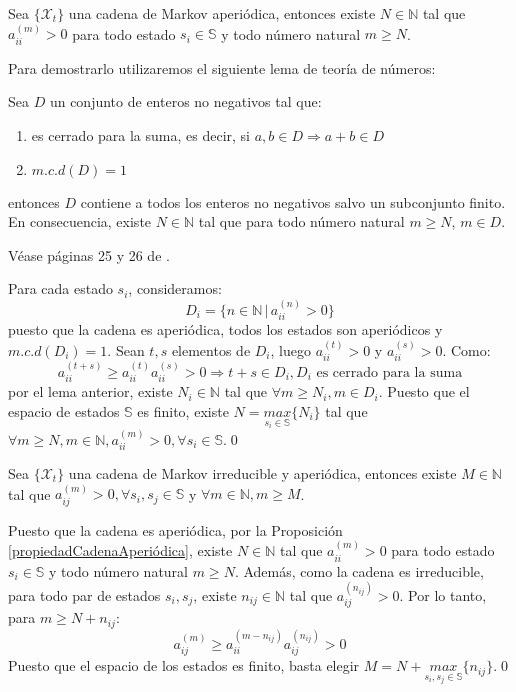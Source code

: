 \begin{proposition}\label{propiedadCadenaAperiódica}
    Sea $\{\mathcal{X}_t\}$ una cadena de Markov aperiódica, entonces existe $N\in\mathbb{N}$ tal que $a_{ii}^{(m)}>0$ para todo estado $s_i\in\mathbb{S}$ y todo número natural $m\geq N$.
\end{proposition}
Para demostrarlo utilizaremos el siguiente lema de teoría de números:
\begin{lemma}
Sea $D$ un conjunto de enteros no negativos tal que:
\begin{enumerate}
    \item es cerrado para la suma, es decir, si $a,b\in D\Longrightarrow a+b\in D$
    \item $m.c.d(D)=1$
\end{enumerate}
entonces $D$ contiene a todos los enteros no negativos salvo un subconjunto finito. En consecuencia, existe $N\in\mathbb{N}$ tal que para todo número natural $m\geq N$, $m\in D$.
\end{lemma}
\begin{proofs*}
    Véase páginas 25 y 26 de \cite{Klappenecker}.  
\end{proofs*}
\begin{proofs*}
Para cada estado $s_i$, consideramos:
\[D_i=\{n\in\mathbb{N}\,|\, a_{ii}^{(n)}>0\}\]
puesto que la cadena es aperiódica, todos los estados son aperiódicos y $m.c.d(D_i)=1$. Sean $t,s$ elementos de $D_i$, luego $a_{ii}^{(t)}>0$ y $a_{ii}^{(s)}>0$. Como:
\[a_{ii}^{(t+s)}\geq a_{ii}^{(t)}a_{ii}^{(s)}>0\Longrightarrow t+s\in D_i,D_i \text{ es cerrado para la suma}\]
por el lema anterior, existe $N_i\in\mathbb{N}$ tal que $\forall m\geq N_i, m\in D_i$. Puesto que el espacio de estados $\mathbb{S}$ es finito, existe $N=\underset{s_i\in\mathbb{S}}{max}\{N_i\}$ tal que $\forall m\geq N, m\in\mathbb{N}, a_{ii}^{(m)}>0, \forall s_i\in\mathbb{S}$.\qed
\end{proofs*}

\begin{proposition}\label{propiedadCadenaIrreducibleAperiódica}
    Sea $\{\mathcal{X}_t\}$ una cadena de Markov irreducible y aperiódica, entonces existe $M\in\mathbb{N}$ tal que $a_{ij}^{(m)}>0, \forall s_i, s_j\in\mathbb{S}$ y $\forall m\in\mathbb{N}, m\geq M$.
\end{proposition}
\begin{proofs*}
Puesto que la cadena es aperiódica, por la Proposición \ref{propiedadCadenaAperiódica}, existe $N\in\mathbb{N}$ tal que $a_{ii}^{(m)}>0$ para todo estado $s_i\in\mathbb{S}$ y todo número natural $m\geq N$.
Además, como la cadena es irreducible, para todo par de estados $s_i, s_j$, existe $n_{ij}\in\mathbb{N}$ tal que $a_{ij}^{(n_{ij})}>0$. Por lo tanto, para $m\geq N+n_{ij}$:
\[a_{ij}^{(m)}\geq a_{ii}^{(m-n_{ij})}a_{ij}^{(n_{ij})}>0\]
Puesto que el espacio de los estados es finito, basta elegir $M=N+\underset{s_i,s_j\in\mathbb{S}}{max}\{n_{ij}\}$.\qed
\end{proofs*}

